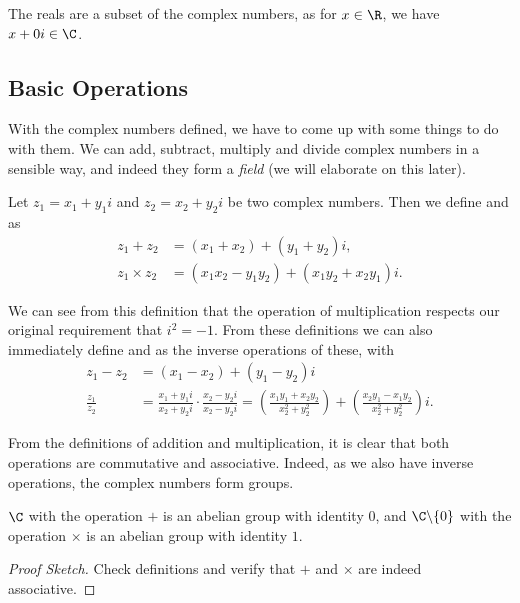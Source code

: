 \documentclass[a4]{scrreprt}
\begin{document}
The reals are a subset of the complex numbers, as for $x \in \R$, we have $x + 0i \in \C$. 

\subsection{Basic Operations}

With the complex numbers defined, we have to come up with some things to do with them.
We can add, subtract, multiply and divide complex numbers in a sensible way, and indeed they form a \emph{field} (we will elaborate on this later).

\begin{definition}
	Let $z_1 = x_1 + y_1 i$ and $z_2 = x_2 + y_2 i$ be two complex numbers. Then we define  and  as
	\begin{align*}
		z_1 + z_2 &= (x_1 + x_2) + (y_1 + y_2)i,\\
		z_1 \times z_2 &= (x_1 x_2 - y_1 y_2) + (x_1 y_2 + x_2 y_1)i.
	\end{align*}
\end{definition}

We can see from this definition that the operation of multiplication respects our original requirement that $i^2 = -1$. From these definitions we can also immediately define  and  as the inverse operations of these, with
\begin{align*}
	z_1 - z_2 &= (x_1 - x_2) + (y_1 - y_2)i \\
	\frac{z_1}{z_2} &= \frac{x_1 + y_1 i}{x_2 + y_2 i} \cdot \frac{x_2 - y_2i}{x_2 - y_2 i} = \left(\frac{x_1y_1 + x_2 y_2}{x_2^2 + y_2^2}\right) + \left(\frac{x_2y_1 - x_1 y_2}{x_2^2 + y_2^2}\right)i.
\end{align*}

From the definitions of addition and multiplication, it is clear that both operations are commutative and associative. Indeed, as we also have inverse operations, the complex numbers form groups.

\begin{proposition}[$\C$ is a Group]
	$\C$ with the operation $+$ is an abelian group with identity $0$, and $\C \backslash \{0\}$ with the operation $\times$ is an abelian group with identity $1$.
\end{proposition}
\begin{proof}[Proof Sketch]
	Check definitions and verify that $+$ and $\times$ are indeed associative.
\end{proof}
\end{document}
